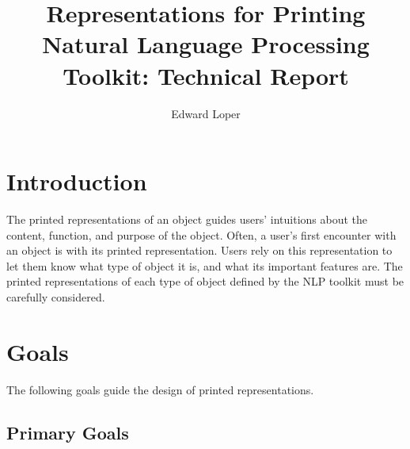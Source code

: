 \documentclass[11pt]{article}
\begin{document}
\title{Representations for Printing\\
\Large Natural Language Processing Toolkit: Technical Report}
\author{Edward Loper}
\maketitle


\section{Introduction}

  The printed representations of an object guides users' intuitions
  about the content, function, and purpose of the object.  Often, a
  user's first encounter with an object is with its printed
  representation.  Users rely on this representation to let them know
  what type of object it is, and what its important features are.  The
  printed representations of each type of object defined by the NLP
  toolkit must be carefully considered.

\section{Goals}

  The following goals guide the design of printed representations.

  \subsection{Primary Goals}
\end{document}
